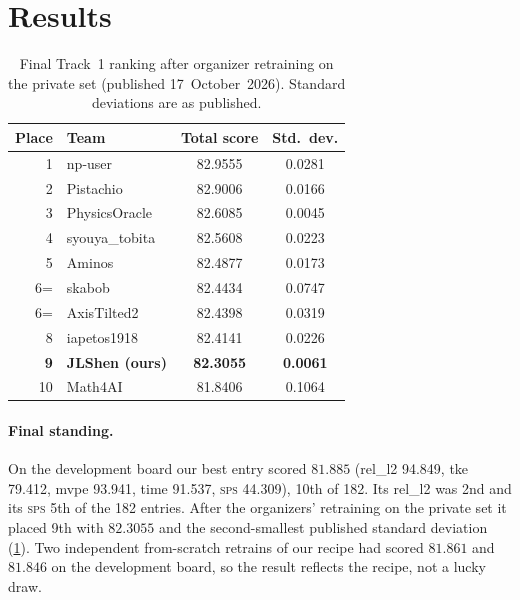\documentclass[10pt]{article}
\newcommand{\sps}{\textsc{sps}}
\begin{document}
\section{Results}
\label{sec:results}

\begin{table}[t]
\centering
\caption{Final Track~1 ranking after organizer retraining on the private set (published 17~October~2026). Standard deviations are as published.}
\label{tab:final}
\small
\begin{tabular}{rlcc}
\toprule
Place & Team & Total score & Std.\ dev.\\
\midrule
1 & np-user & 82.9555 & 0.0281\\
2 & Pistachio & 82.9006 & 0.0166\\
3 & PhysicsOracle & 82.6085 & 0.0045\\
4 & syouya\_tobita & 82.5608 & 0.0223\\
5 & Aminos & 82.4877 & 0.0173\\
6= & skabob & 82.4434 & 0.0747\\
6= & AxisTilted2 & 82.4398 & 0.0319\\
8 & iapetos1918 & 82.4141 & 0.0226\\
\textbf{9} & \textbf{JLShen (ours)} & \textbf{82.3055} & \textbf{0.0061}\\
10 & Math4AI & 81.8406 & 0.1064\\
\bottomrule
\end{tabular}
\end{table}

\paragraph{Final standing.} On the development board our best entry scored $81.885$ (rel\_l2 94.849, tke 79.412, mvpe 93.941, time 91.537, \sps{} 44.309), 10th of 182. Its rel\_l2 was 2nd and its \sps{} 5th of the 182 entries. After the organizers' retraining on the private set it placed 9th with $82.3055$ and the second-smallest published standard deviation (\cref{tab:final}). Two independent from-scratch retrains of our recipe had scored $81.861$ and $81.846$ on the development board, so the result reflects the recipe, not a lucky draw.
\end{document}
